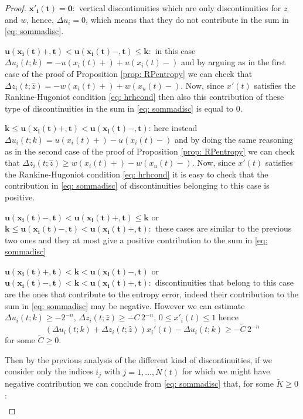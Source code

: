 \documentclass[12pt]{article}
\newcommand{\RH}{Rankine-Hugoniot }
\newcommand{\1}{\mathds{1}}
\theoremstyle{definition}
\begin{document}
\begin{proof}
    $\boldsymbol{x'_i(t)=0:}$ vertical discontinuities which are only discontinuities for $z$ and $w$, hence, $\Delta u_i=0$, which means that they do not contribute in the sum in \eqref{eq: sommadisc}. \par
    $\boldsymbol{u(x_i(t)+,t)<u(x_i(t)-,t)\leq k:}$ in this case $\Delta u_i(t;k)=-u(x_i(t)+)+u(x_i(t)-)$ and by arguing as in the first case of the proof of Proposition \ref{prop: RPentropy} we can check that $\Delta z_i(t;\hat{z})= -w(x_i(t)+)+w(x_u(t)-)$. Now, since $x'(t)$ satisfies the \RH condition \eqref{eq: hrhcond} then also this contribution of these type of discontinuities in the sum in \eqref{eq: sommadisc} is equal to $0$.\par $\boldsymbol{k\leq u(x_i(t)+,t)<u(x_i(t)-,t)}$: here instead $\Delta u_i(t;k)=u(x_i(t)+)-u(x_i(t)-)$ and by doing the same reasoning as in the second case of the proof of Proposition \ref{prop: RPentropy} we can check that $\Delta z_i(t;\hat{z})\geq w(x_i(t)+)-w(x_u(t)-)$. Now, since $x'(t)$ satisfies the \RH condition \eqref{eq: hrhcond} it is easy to check that the contribution in \eqref{eq: sommadisc} of discontinuities belonging to this case  is positive.\par$\boldsymbol{ u(x_i(t)-,t)<u(x_i(t)+,t)\leq k}$ or $\boldsymbol{k\leq u(x_i(t)-,t)<u(x_i(t)+,t):}$ these cases are similar to the previous two ones and they at most give a positive  contribution to the sum in \eqref{eq: sommadisc} \par $\boldsymbol{u(x_i(t)+,t)<k<u(x_i(t)-,t)}$ or
    $\boldsymbol{u(x_i(t)-,t)<k<u(x_i(t)+,t):}$ discontinuities that belong to this case are the ones that contribute to the entropy error, indeed their contribution to the sum in \eqref{eq: sommadisc} may be negative. However we can estimate $\Delta u_i(t;k) \geq -2^{-n}$, $\Delta z_i(t;\hat{z}) \geq -C\, 2^{-n}$, $0\leq x'_i(t) \leq 1$ hence \begin{equation}
        \left( \Delta u_i(t;k)+\Delta z_i(t;\hat{z}) \right) x_i'(t) - \Delta u_i(t;k) \geq - \tilde{C}\, 2^{-n}
    \end{equation} for some $\tilde{C}\geq0$. \par
    Then by the previous analysis of the different kind of discontinuities, if we consider only the indices $i_j$ with $j=1,\dots, \tilde{N}(t)$ for which we might have negative contribution we can conclude from \eqref{eq: sommadisc} that, for some $\tilde{K}\geq 0$: \begin{equation}\begin{split}\label{eq: finaleentrop}

\end{split}
\end{equation}
\end{proof}
\end{document}

